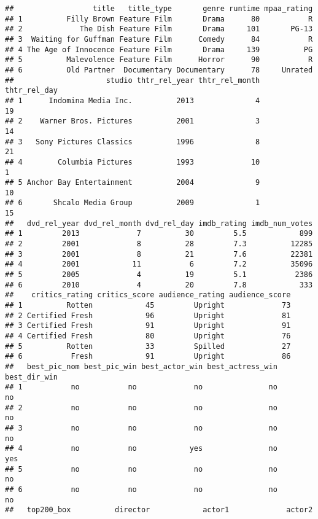 \documentclass[]{article}
\begin{document}
\begin{verbatim}
##                  title   title_type       genre runtime mpaa_rating
## 1          Filly Brown Feature Film       Drama      80           R
## 2             The Dish Feature Film       Drama     101       PG-13
## 3  Waiting for Guffman Feature Film      Comedy      84           R
## 4 The Age of Innocence Feature Film       Drama     139          PG
## 5          Malevolence Feature Film      Horror      90           R
## 6          Old Partner  Documentary Documentary      78     Unrated
##                     studio thtr_rel_year thtr_rel_month thtr_rel_day
## 1      Indomina Media Inc.          2013              4           19
## 2    Warner Bros. Pictures          2001              3           14
## 3   Sony Pictures Classics          1996              8           21
## 4        Columbia Pictures          1993             10            1
## 5 Anchor Bay Entertainment          2004              9           10
## 6       Shcalo Media Group          2009              1           15
##   dvd_rel_year dvd_rel_month dvd_rel_day imdb_rating imdb_num_votes
## 1         2013             7          30         5.5            899
## 2         2001             8          28         7.3          12285
## 3         2001             8          21         7.6          22381
## 4         2001            11           6         7.2          35096
## 5         2005             4          19         5.1           2386
## 6         2010             4          20         7.8            333
##    critics_rating critics_score audience_rating audience_score
## 1          Rotten            45         Upright             73
## 2 Certified Fresh            96         Upright             81
## 3 Certified Fresh            91         Upright             91
## 4 Certified Fresh            80         Upright             76
## 5          Rotten            33         Spilled             27
## 6           Fresh            91         Upright             86
##   best_pic_nom best_pic_win best_actor_win best_actress_win best_dir_win
## 1           no           no             no               no           no
## 2           no           no             no               no           no
## 3           no           no             no               no           no
## 4           no           no            yes               no          yes
## 5           no           no             no               no           no
## 6           no           no             no               no           no
##   top200_box          director            actor1             actor2

\end{verbatim}
\end{document}
